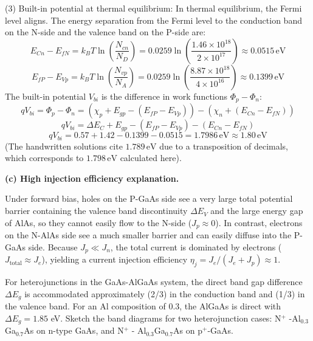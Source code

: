 (3) Built-in potential at thermal equilibrium:
In thermal equilibrium, the Fermi level aligns. The energy separation from the Fermi level to the conduction band on the N-side and the valence band on the P-side are:
\begin{equation*}
  E_{Cn} - E_{fN} = k_B T \ln\left(\frac{N_{cn}}{N_D}\right) = 0.0259 \ln\left(\frac{1.46 \times 10^{18}}{2 \times 10^{17}}\right) \approx 0.0515\,\text{eV}
\end{equation*}
\begin{equation*}
  E_{fP} - E_{Vp} = k_B T \ln\left(\frac{N_{vp}}{N_A}\right) = 0.0259 \ln\left(\frac{8.87 \times 10^{18}}{4 \times 10^{16}}\right) \approx 0.1399\,\text{eV}
\end{equation*}
The built-in potential $V_{bi}$ is the difference in work functions $\Phi_p - \Phi_n$:
\begin{equation*}
  q V_{bi} = \Phi_p - \Phi_n = \left(\chi_p + E_{gp} - (E_{fP} - E_{Vp})\right) - \left(\chi_n + (E_{Cn} - E_{fN})\right)
\end{equation*}
\begin{equation*}
  q V_{bi} = \Delta E_C + E_{gp} - (E_{fP} - E_{Vp}) - (E_{Cn} - E_{fN})
\end{equation*}
\begin{equation*}
  q V_{bi} = 0.57 + 1.42 - 0.1399 - 0.0515 = 1.7986\,\text{eV} \approx 1.80\,\text{eV}
\end{equation*}
(The handwritten solutions cite $1.789\,\text{eV}$ due to a transposition of decimals, which corresponds to $1.798\,\text{eV}$ calculated here).

\textbf{(c) High injection efficiency explanation.}

Under forward bias, holes on the P-GaAs side see a very large total potential barrier containing the valence band discontinuity $\Delta E_V$ and the large energy gap of AlAs, so they cannot easily flow to the N-side ($J_p \approx 0$). In contrast, electrons on the N-AlAs side see a much smaller barrier and can easily diffuse into the P-GaAs side. Because $J_p \ll J_n$, the total current is dominated by electrons ($J_{\text{total}} \approx J_e$), yielding a current injection efficiency $\eta_j = J_e / (J_e + J_p) \approx 1$.


\begin{question}[Question 5]
For heterojunctions in the GaAs-AlGaAs system, the direct band gap difference $\Delta E_g$ is accommodated approximately (2/3) in the conduction band and (1/3) in the valence band. For an Al composition of 0.3, the AlGaAs is direct with $\Delta E_g = 1.85$ eV. Sketch the band diagrams for two heterojunction cases: N$^+$ -Al$_{0.3}$Ga$_{0.7}$As on n-type GaAs, and N$^+$ - Al$_{0.3}$Ga$_{0.7}$As on p$^+$-GaAs.
\end{question}

